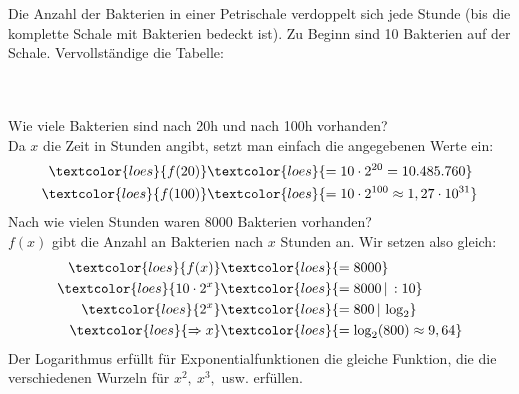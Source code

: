 Die Anzahl der Bakterien in einer Petrischale verdoppelt sich jede Stunde (bis die komplette Schale mit Bakterien bedeckt ist). Zu Beginn sind 10 Bakterien auf der Schale. Vervollständige die Tabelle:\\
\vspace{0.3cm}\\
\begin{minipage}{0.50\textwidth}
	\vspace{0.3cm}\\
	Wie viele Bakterien sind nach 20h und nach 100h vorhanden?\\
	\textcolor{loes}{Da \(x\) die Zeit in Stunden angibt, setzt man einfach die angegebenen Werte ein:}
	\begin{align*}
		\textcolor{loes}{f(20)}&\textcolor{loes}{=10\cdot 2^{20}=10.485.760}\\
		\textcolor{loes}{f(100)}&\textcolor{loes}{=10\cdot 2^{100}\approx 1,27\cdot 10^{31}}
	\end{align*}
	Nach wie vielen Stunden waren 8000 Bakterien vorhanden?\\
	\textcolor{loes}{\(f(x)\) gibt die Anzahl an Bakterien nach \(x\) Stunden an. Wir setzen also gleich:}
	\begin{align*}
		\textcolor{loes}{f(x)}&\textcolor{loes}{=8000}\\
		\textcolor{loes}{10\cdot 2^x}&\textcolor{loes}{=8000\,\vert\,:10}\\
		\textcolor{loes}{2^x}&\textcolor{loes}{=800\,\vert\,\log_2}\\
		\textcolor{loes}{\Rightarrow x}&\textcolor{loes}{=\log_2(800)\approx 9,64}
	\end{align*}
	\textcolor{loes}{Der Logarithmus erfüllt für Exponentialfunktionen die gleiche Funktion, die die verschiedenen Wurzeln für \(x^2,\ x^3,\) usw. erfüllen.}\\
\end{minipage}
